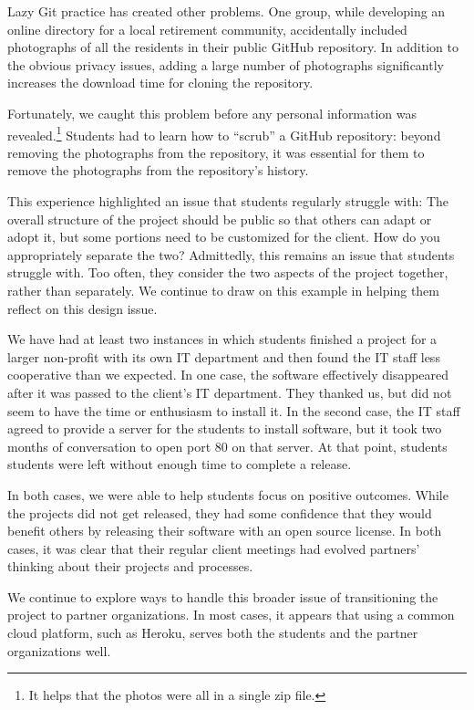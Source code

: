 Lazy Git practice has created other problems.  One group, while
developing an online directory for a local retirement community,
accidentally included photographs of all the residents in their
public GitHub repository.  In addition to the obvious privacy issues,
adding a large number of photographs significantly increases
the download time for cloning the repository.

Fortunately, we caught this problem before any personal information
was revealed.\footnote{It helps that the photos were all in a single
zip file.}  Students had to learn how to ``scrub'' a GitHub repository:
beyond removing the photographs from the repository, it was essential
for them to remove the photographs from the repository's history.

This experience highlighted an issue that students regularly struggle
with: The overall structure of the project should be public so that
others can adapt or adopt it, but some portions need to be customized
for the client.  How do you appropriately separate the two?
Admittedly, this remains an issue that students struggle with. Too
often, they consider the two aspects of the project together, rather
than separately.  We continue to draw on this example in helping them
reflect on this design issue.

We have
had at least two instances in which students finished a project for
a larger non-profit with its own IT department and then found
the IT staff less cooperative than we expected.  In one
case, the software effectively disappeared after it was passed to
the client's IT department.  They thanked us, but did not seem
to have the time or enthusiasm to install it.  In the second case,
the IT staff agreed to provide a server for the students to install
software, but it took two months of conversation to open port 80 on
that server.  At that point, students students were left without enough
time to complete a release.

In both cases, we were able to help students focus on positive
outcomes.  While the projects did not get released, they had some
confidence that they would benefit others by releasing their software
with an open source license. In both cases, it was clear that their
regular client meetings had evolved partners' thinking about their
projects and processes.

We continue to explore ways to handle this broader issue of
transitioning the project to partner organizations.  In most cases,
it appears that using a common cloud platform, such as Heroku,
serves both the students and the partner organizations well.

